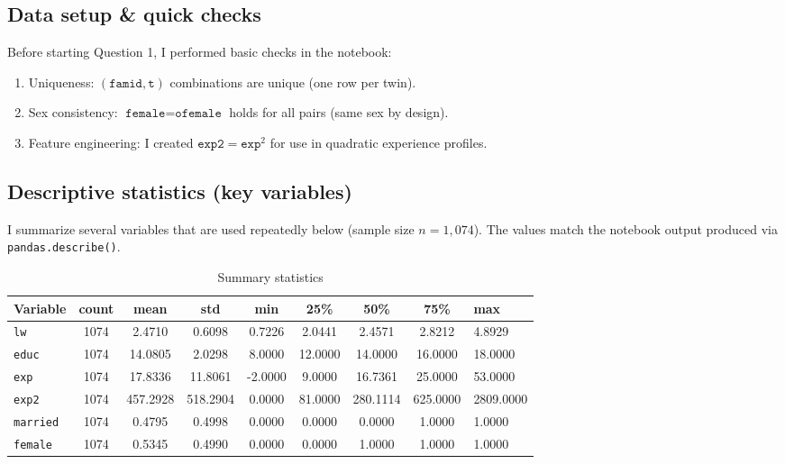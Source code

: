 \documentclass[12pt]{article}
\begin{document}
\subsection*{Data setup \& quick checks}
Before starting Question 1, I performed basic checks in the notebook:
\begin{enumerate}[label=\arabic*)]
  \item Uniqueness: \((\texttt{famid},\texttt{t})\) combinations are unique (one row per twin).
  \item Sex consistency: \(\texttt{female}=\texttt{ofemale}\) holds for all pairs (same sex by design).
  \item Feature engineering: I created \(\texttt{exp2}=\texttt{exp}^2\) for use in quadratic experience profiles.
\end{enumerate}

\subsection*{Descriptive statistics (key variables)}
I summarize several variables that are used repeatedly below (sample size \(n=1{,}074\)). The values match the notebook output produced via \texttt{pandas.describe()}.
\begin{table}[h!]
  \centering
  \caption{Summary statistics}
  \label{tab:desc}
  \begin{tabular}{l
                  S[table-format=4.0]
                  S[table-format=1.4]
                  S[table-format=1.4]
                  S[table-format=1.4]
                  S[table-format=1.4]
                  S[table-format=1.4]
                  S[table-format=1.4]}
    \toprule
    Variable & {count} & {mean} & {std} & {min} & {25\%} & {50\%} & {75\%} & {max} \\
    \midrule
    \texttt{lw}     & 1074 & 2.4710 & 0.6098 & 0.7226 & 2.0441 & 2.4571 & 2.8212 & 4.8929 \\
    \texttt{educ}   & 1074 & 14.0805 & 2.0298 & 8.0000 & 12.0000 & 14.0000 & 16.0000 & 18.0000 \\
    \texttt{exp}    & 1074 & 17.8336 & 11.8061 & -2.0000 & 9.0000 & 16.7361 & 25.0000 & 53.0000 \\
    \texttt{exp2}   & 1074 & 457.2928 & 518.2904 & 0.0000 & 81.0000 & 280.1114 & 625.0000 & 2809.0000 \\
    \texttt{married}& 1074 & 0.4795 & 0.4998 & 0.0000 & 0.0000 & 0.0000 & 1.0000 & 1.0000 \\
    \texttt{female} & 1074 & 0.5345 & 0.4990 & 0.0000 & 0.0000 & 1.0000 & 1.0000 & 1.0000 \\
    \bottomrule
  \end{tabular}
\end{table}
\end{document}

